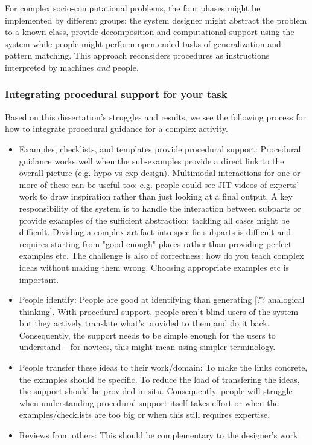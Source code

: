 For complex socio-computational problems, the four phases might be implemented by different groups: the system designer might abstract the problem to a known class, provide decomposition and computational support using the system while people might perform open-ended tasks of generalization and pattern matching. This approach reconsiders procedures as instructions interpreted by machines \textit{and} people.

\subsubsection{Integrating procedural support for your task}
Based on this dissertation's struggles and results, we see the following process for how to integrate procedural guidance for a complex activity.
\begin{itemize}
\item Examples, checklists, and templates provide procedural support: Procedural guidance works well when the sub-examples provide a direct link to the overall picture (e.g. hypo vs exp design).  Multimodal interactions for one or more of these can be useful too: e.g. people could see JIT videos of experts' work to draw inspiration rather than just looking at a final output. A key responsibility of the system is to handle the interaction between subparts or  provide examples of the sufficient abstraction; tackling all cases might be difficult. Dividing a complex artifact into specific subparts is difficult and requires starting from "good enough" places rather than providing perfect examples etc. The challenge is also of correctness: how do you teach complex ideas without making them wrong. Choosing appropriate examples etc is important.
\item People identify: People are good at identifying than generating [?? analogical thinking]. With procedural support, people aren’t blind users of the system but they actively translate what’s provided to them and do it back. Consequently, the support needs to be simple enough for the users to understand -- for novices, this might mean using simpler terminology. 
\item People transfer these ideas to their work/domain: To make the links concrete, the examples should be specific. To reduce the load of transfering the ideas, the support should be provided in-situ. Consequently, people will struggle when understanding procedural support itself takes effort or when the examples/checklists are too big or when this still requires expertise. 
\item Reviews from others: This should be complementary to the designer's work.
\end{itemize}


